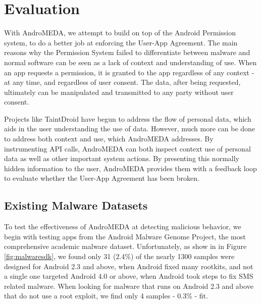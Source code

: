 \chapter{Evaluation}
\label{sec:framework}

With AndroMEDA, we attempt to build on top of the Android Permission system, to do a better job at enforcing the User-App Agreement. The main reasons why the Permission System failed to differentiate between malware and normal software can be seen as a lack of context and understanding of use. When an app requests a permission, it is granted to the app regardless of any context - at any time, and regardless of user consent. The data, after being requested, ultimately can be manipulated and transmitted to any party without user consent. 

Projects like TaintDroid\citep{enck2010taintdroid} have begun to address the flow of personal data, which aids in the user understanding the use of data. However, much more can be done to address both context and use, which AndroMEDA addresses. By instrumenting API calls, AndroMEDA can both inspect context use of personal data as well as other important system actions. By presenting this normally hidden information to the user, AndroMEDA provides them with a feedback loop to evaluate whether the User-App Agreement has been broken.

\section{Existing Malware Datasets}



To test the effectiveness of AndroMEDA at detecting malicious behavior, we begin with testing apps from the Android Malware Genome Project\citep{zhou2012dissecting}, the most comprehensive academic malware dataset. Unfortunately, as show in in Figure \ref{fig:malwaresdk}, we found only 31 (2.4\%) of the nearly 1300 samples were designed for Android 2.3 and above, when Android fixed many rootkits, and not a single one targeted Android 4.0 or above, when Android took steps to fix SMS related malware. When looking for malware that runs on Android 2.3 and above that do not use a root exploit, we find only 4 samples - 0.3\% - fit. 

